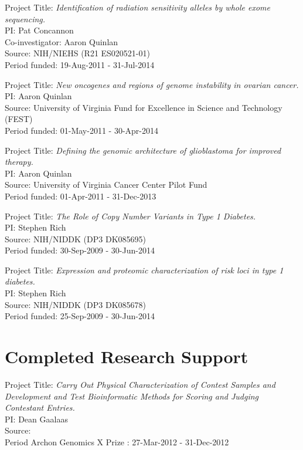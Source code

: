 \documentclass[margin,line]{cv}
\begin{document}
\begin{resume}
    Project Title: \textit{Identification of radiation sensitivity alleles by whole exome sequencing.} \\
    PI: Pat Concannon \\
    Co-investigator: Aaron Quinlan \\
    Source: NIH/NIEHS (R21 ES020521-01) \\
    Period funded: 19-Aug-2011 - 31-Jul-2014
	    
    \vspace{-2mm}
    Project Title: \textit{New oncogenes and regions of genome instability in ovarian cancer.} \\
    PI: Aaron Quinlan \\
    Source: University of Virginia Fund for Excellence in Science and Technology (FEST) \\
    Period funded: 01-May-2011 - 30-Apr-2014
    
    \vspace{-2mm}
    Project Title: \textit{Defining the genomic architecture of glioblastoma for improved therapy.} \\
    PI: Aaron Quinlan \\
    Source: University of Virginia Cancer Center Pilot Fund\\
    Period funded: 01-Apr-2011 - 31-Dec-2013

    \vspace{-2mm}
    Project Title: \textit{The Role of Copy Number Variants in Type 1 Diabetes.} \\
    PI: Stephen Rich \\
    Source: NIH/NIDDK (DP3 DK085695)\\
    Period funded: 30-Sep-2009 - 30-Jun-2014

    \vspace{-2mm}
    Project Title: \textit{Expression and proteomic characterization of risk loci in type 1 diabetes.} \\
    PI: Stephen Rich \\
    Source: NIH/NIDDK (DP3 DK085678)\\
    Period funded: 25-Sep-2009 - 30-Jun-2014


    \section{\mysidestyle Completed Research Support}

    \vspace{-2mm}
    Project Title: \textit{Carry Out Physical Characterization of Contest Samples and Development and Test Bioinformatic Methods for Scoring and Judging Contestant Entries.}\\
    PI: Dean Gaalaas\\
    Source: \\
    Period Archon Genomics X Prize : 27-Mar-2012 - 31-Dec-2012


\end{resume}
\end{document}
